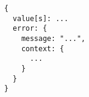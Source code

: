 \begin{lstlisting}[language=numbered,caption={Shape of the \acrshort{api} responses},label=code:api_response_shape,float,floatplacement=H]
{
  value[s]: ...
  error: {
    message: "...",
    context: {
      ...
    }
  }
}
\end{lstlisting}